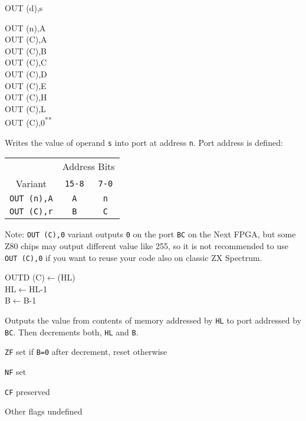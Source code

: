\documentclass[twoside,openright,a4paper]{book}
\newcommand{\UNDOC}{\textnormal{\textsuperscript{**}}}
\begin{document}
\begin{basedescript}{
	\desclabelstyle{\multilinelabel}
	\desclabelwidth{3cm}}
\begin{detailitem}{OUT (d),s}
		\begin{DetailVariants}
			OUT (n),A\\
			OUT (C),A\\
			OUT (C),B\\
			OUT (C),C\\
			OUT (C),D\\
			OUT (C),E\\
			OUT (C),H\\
			OUT (C),L\\
			OUT (C),0\UNDOC
		\end{DetailVariants}

		Writes the value of operand {\tt s} into port at address {\tt n}. Port address is defined:

		\begin{tabular}{ccc}
			& \multicolumn{2}{c}{Address Bits} \\
			Variant & {\tt 15-8} & {\tt 7-0} \\
			\hline
			{\tt OUT (n),A} & {\tt A} & {\tt n} \\
			{\tt OUT (C),r} & {\tt B} & {\tt C} \\
		\end{tabular}
		\vspace{1ex} %

		Note: {\tt OUT (C),0} variant outputs {\tt 0} on the port {\tt BC} on the Next FPGA, but some Z80 chips may output different value like 255, so it is not recommended to use {\tt OUT (C),0} if you want to reuse your code also on classic ZX Spectrum.

		\DetailNoEffect
				
		\begin{DetailTiming}
		\end{DetailTiming}

	\end{detailitem}

	\begin{detailitem}{OUTD}
		{(C)$\leftarrow$(HL)\\
		HL$\leftarrow$HL-1\\
		B$\leftarrow$B-1}

		Outputs the value from contents of memory addressed by {\tt HL} to port addressed by {\tt BC}. Then decrements both, {\tt HL} and {\tt B}.

		\begin{DetailEffects}
			\item {\tt ZF} set if {\tt B=0} after decrement, reset otherwise
			\item {\tt NF} set
			\item {\tt CF} preserved
			\item Other flags undefined
		\end{DetailEffects}
				

\end{detailitem}
\end{basedescript}
\end{document}
